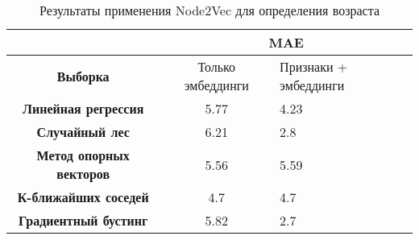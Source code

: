 \begin{table}[!htb]
\centering
\begin{tabular}{|c|c|l|}
\hline
\textbf{}                       & \multicolumn{2}{c|}{MAE}                  \\ \hline
\textbf{Выборка}                & Только эмбеддинги & Признаки + эмбеддинги \\ \hline
\textbf{Линейная регрессия}     &    5.77               &     4.23                  \\ \hline
\textbf{Случайный лес}          &    6.21               &    2.8                   \\ \hline
\textbf{Метод опорных векторов} &      5.56             &      5.59                 \\ \hline
\textbf{К-ближайших соседей}    &       4.7            &        4.7               \\ \hline
\textbf{Градиентный бустинг}    &      5.82             &        2.7               \\ \hline
\end{tabular}
\caption{Результаты применения Node2Vec для определения возраста}
\label{Node2Vec age table}
\end{table}

